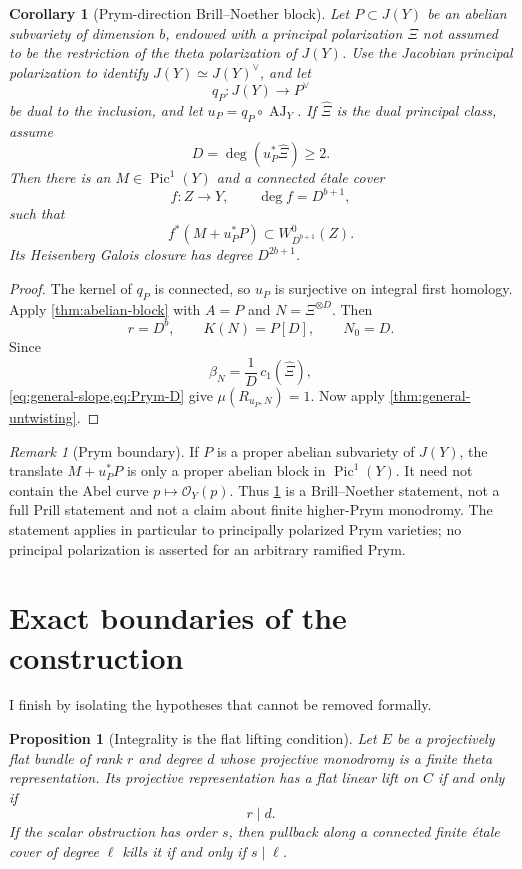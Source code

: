 \documentclass[11pt,reqno]{amsart}
\numberwithin{equation}{section}
\newtheorem{proposition}[proposition]{Proposition}
\newtheorem{corollary}[corollary]{Corollary}
\theoremstyle{remark}
\newtheorem{remark}[remark]{Remark}
\DeclareMathOperator{\Pic}{Pic}
\newcommand{\cO}{\mathcal O}
\begin{document}
\begin{corollary}[Prym-direction Brill--Noether block]\label{cor:prym-block}
Let \(P\subset J(Y)\) be an abelian subvariety of dimension \(b\),
endowed with a principal polarization \(\Xi\) not assumed to be the
restriction of the theta polarization of \(J(Y)\).  Use the Jacobian
principal polarization to identify \(J(Y)\simeq J(Y)^\vee\), and let
\[
 q_P\colon J(Y)\longrightarrow P^\vee
\]
be dual to the inclusion, and let
\(u_P=q_P\circ\operatorname{AJ}_Y\).  If \(\widehat\Xi\) is the dual
principal class, assume
\[
 D=\deg(u_P^*\widehat\Xi)\geq2.
\tag{8.19}\label{eq:Prym-D}
\]
Then there is an \(M\in\Pic^1(Y)\) and a connected \'etale cover
\[
 f\colon Z\longrightarrow Y,\qquad
 \deg f=D^{b+1},
\tag{8.20}\label{eq:Prym-cover-degree}
\]
such that
\[
 f^*(M+u_P^*P)\subset W_{D^{b+1}}^0(Z).
\tag{8.21}\label{eq:Prym-block}
\]
Its Heisenberg Galois closure has degree \(D^{2b+1}\).
\end{corollary}

\begin{proof}
The kernel of \(q_P\) is connected, so \(u_P\) is surjective on integral
first homology.  Apply \cref{thm:abelian-block} with
\(A=P\) and \(N=\Xi^{\otimes D}\).  Then
\[
 r=D^b,\qquad K(N)=P[D],\qquad N_0=D.
\]
Since
\[
 \beta_N=\frac1D\,c_1(\widehat\Xi),
\]
\cref{eq:general-slope,eq:Prym-D} give
\(\mu(R_{u_P,N})=1\).  Now apply
\cref{thm:general-untwisting}.
\end{proof}

\begin{remark}[Prym boundary]\label{rem:Prym-boundary}
If \(P\) is a proper abelian subvariety of \(J(Y)\), the translate
\(M+u_P^*P\) is only a proper abelian block in \(\Pic^1(Y)\).  It need
not contain the Abel curve \(p\mapsto\cO_Y(p)\).  Thus
\cref{cor:prym-block} is a Brill--Noether statement, not a full Prill
statement and not a claim about finite higher-Prym monodromy.
The statement applies in particular to principally polarized Prym
varieties; no principal polarization is asserted for an arbitrary
ramified Prym.
\end{remark}

\section{Exact boundaries of the construction}

I finish by isolating the hypotheses that cannot be removed formally.

\begin{proposition}[Integrality is the flat lifting condition]\label{prop:integrality-boundary}
Let \(E\) be a projectively flat bundle of rank \(r\) and degree \(d\)
whose projective monodromy is a finite theta representation.  Its
projective representation has a flat linear lift on \(C\) if and only if
\[
 r\mid d.
\tag{9.1}\label{eq:integrality-iff}
\]
If the scalar obstruction has order \(s\), then pullback along a
connected finite \'etale cover of degree \(\ell\) kills it if and only
if \(s\mid\ell\).
\end{proposition}
\end{document}
